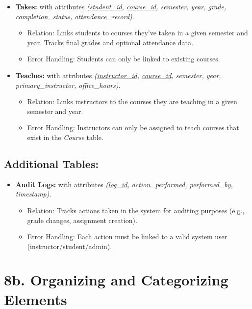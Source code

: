 \documentclass[12pt]{article}
\begin{document}
\begin{itemize}
    \item \textbf{Takes:} with attributes \textit{(\underline{student\_id}, \underline{course\_id}, semester, year, grade, completion\_status, attendance\_record)}.
    \begin{itemize}
        \item Relation: Links students to courses they've taken in a given semester and year. Tracks final grades and optional attendance data.
        \item Error Handling: Students can only be linked to existing courses.
    \end{itemize}

    \item \textbf{Teaches:} with attributes \textit{(\underline{instructor\_id}, \underline{course\_id}, semester, year, primary\_instructor, office\_hours)}.
    \begin{itemize}
        \item Relation: Links instructors to the courses they are teaching in a given semester and year.
        \item Error Handling: Instructors can only be assigned to teach courses that exist in the \textit{Course} table.
    \end{itemize}
\end{itemize}

\subsection*{Additional Tables:}

\begin{itemize}
    \item \textbf{Audit Logs:} with attributes \textit{(\underline{log\_id}, action\_performed, performed\_by, timestamp)}.
    \begin{itemize}
        \item Relation: Tracks actions taken in the system for auditing purposes (e.g., grade changes, assignment creation).
        \item Error Handling: Each action must be linked to a valid system user (instructor/student/admin).
    \end{itemize}
\end{itemize}

\pagebreak

\section*{8b. Organizing and Categorizing Elements}
\end{document}

